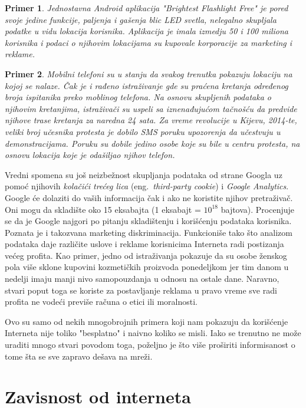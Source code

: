 \documentclass[a4paper]{article}
\newtheorem{primer}{Primer}[section]
\begin{document}
\begin{primer}
	Jednostavna Android aplikacija "Brightest Flashlight 
Free" je pored svoje jedine funkcije, paljenja i gašenja blic LED svetla, nelegalno skupljala podatke u vidu lokacija korisnika. Aplikacija je imala izmedju 50 i 100 miliona korisnika i podaci o njihovim lokacijama su kupovale korporacije za marketing i reklame.\cite{dataAndGoliath}\cite{flashlightApp}\\
\end{primer}

\begin{primer}
	Mobilni telefoni su u stanju da svakog trenutka pokazuju lokaciju na kojoj se nalaze. Čak je i rađeno istraživanje gde su praćena kretanja određenog broja ispitanika preko moblinog telefona. Na osnovu skupljenih podataka o njihovim kretanjima, istraživači su uspeli sa iznenađujućom tačnošću da predvide njihove trase kretanja za naredna 24 sata. Za vreme revolucije u Kijevu, 2014-te, veliki broj učesnika protesta je dobilo SMS poruku upozorenja da učestvuju u demonstracijama. Poruku su dobile jedino osobe koje su bile u centru protesta, na osnovu lokacija koje je odašiljao njihov telefon. \cite{dataAndGoliath}
\end{primer}

	Vredni spomena su još neizbežnost skupljanja podataka od strane Googla uz pomoć njihovih {\em kolačići trećeg lica} (eng.~{\em third-party cookie}) i \textit{Google Analytics}. Google će dolaziti do vaših informacija čak i ako ne koristite njihov pretraživač. Oni mogu da skladište oko 15 eksabajta (1 eksabajt = $10^{18}$ bajtova). Procenjuje se da je Google najgori po pitanju skladištenju i korišćenju podataka korisnika. Poznata je i takozvana marketing diskriminacija. Funkcioniše tako što analizom podataka daje različite uslove i reklame korisnicima Interneta radi postizanja većeg profita. Kao primer, jedno od istraživanja pokazuje da su osobe ženskog pola više sklone kupovini kozmetičkih proizvoda ponedeljkom jer tim danom u nedelji imaju manji nivo samopouzdanja u odnosu na ostale dane. Naravno, stvari poput toga se koriste za postavljanje reklama u pravo vreme sve radi profita ne vodeći previše računa o etici ili moralnosti. \cite{dataAndGoliath} \cite{theNetDelusion}

	Ovo su samo od nekih mnogobrojnih primera koji nam pokazuju da korišćenje Interneta nije toliko "besplatno" i naivno koliko se misli. Iako se trenutno ne može uraditi mnogo stvari povodom toga, poželjno je što više proširiti informisanost o tome šta se sve zapravo dešava na mreži.

\section{Zavisnost od interneta}

\appendix
 

\appendix
\end{document}

